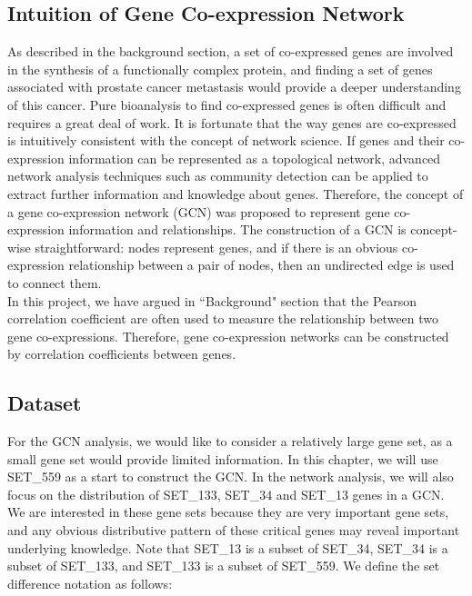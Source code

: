 \documentclass[12pt,a4paper]{report}
\begin{document}
\subsection{Intuition of Gene Co-expression Network }
As described in the background section, a set of co-expressed genes are involved in the synthesis of a functionally complex protein, and finding a set of genes associated with prostate cancer metastasis would provide a deeper understanding of this cancer. Pure bioanalysis to find co-expressed genes is often difficult and requires a great deal of work. It is fortunate that the way genes are co-expressed is intuitively consistent with the concept of network science. If genes and their co-expression information can be represented as a topological network, advanced network analysis techniques such as community detection can be applied to extract further information and knowledge about genes. Therefore, the concept of a gene co-expression network (GCN) was proposed \cite{Stu03} to represent gene co-expression information and relationships. The construction of a GCN is concept-wise straightforward: nodes represent genes, and if there is an obvious co-expression relationship between a pair of nodes, then an undirected edge is used to connect them.\\

In this project, we have argued in ``Background" section that the Pearson correlation coefficient are often used to measure the relationship between two gene co-expressions. Therefore, gene co-expression networks can be constructed by correlation coefficients between genes.\\

\subsection{Dataset}
For the GCN analysis, we would like to consider a relatively large gene set, as a small gene set would provide limited information. In this chapter, we will use SET\_559 as a start to construct the GCN. In the network analysis, we will also focus on the distribution of SET\_133, SET\_34 and SET\_13 genes in a GCN. We are interested in these gene sets because they are very important gene sets, and any obvious distributive pattern of these critical genes may reveal important underlying knowledge. Note that SET\_13 is a subset of SET\_34, SET\_34 is a subset of SET\_133, and SET\_133 is a subset of SET\_559. We define the set difference notation as follows:\\
\end{document}
